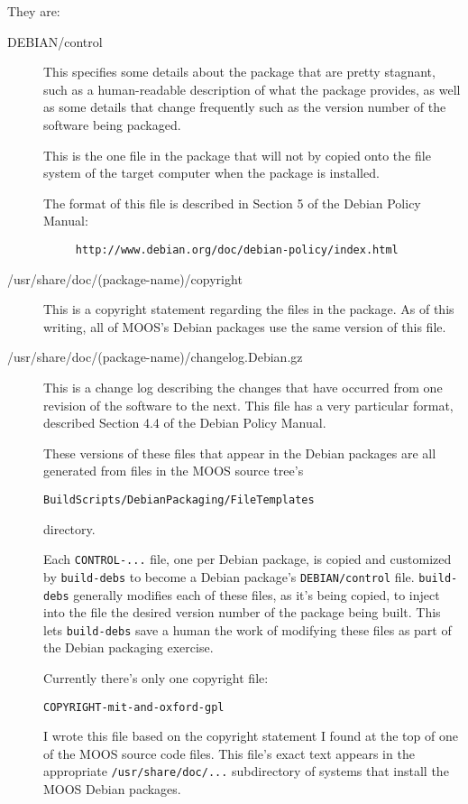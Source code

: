 \documentclass[letterpaper,10pt]{article}
\begin{document}
They are:
\begin{description}
 \item[DEBIAN/control]  This specifies some details about the package that are
	pretty stagnant, such as a human-readable description of what the 
	package provides, as well as some details that change frequently such
	as the version number of the software being packaged.

	This is the one file in the package that will not
	by copied onto the file system of the target computer when the package
	is installed.

	The format of this file is described in Section 5 of the Debian Policy
	Manual:

	\begin{verbatim}
	 http://www.debian.org/doc/debian-policy/index.html
	\end{verbatim} 
 \item[/usr/share/doc/(package-name)/copyright]
	This is a copyright statement regarding the files in the package.
	As of this writing, all of MOOS's Debian packages use the same version
	of this file.

 \item[/usr/share/doc/(package-name)/changelog.Debian.gz]
	This is a change log describing the changes that have occurred 
	from one revision of the software to the next.  This file has a
	very particular format, described Section 4.4 of the Debian
	Policy Manual. 

These versions of these files that appear in the Debian packages are all 
generated from files in the MOOS source tree's
\begin{verbatim}
BuildScripts/DebianPackaging/FileTemplates\end{verbatim} 
directory.

Each \verb|CONTROL-...| file, one per Debian package, is copied and
customized by \verb|build-debs| to become a Debian package's 
\verb|DEBIAN/control| file.  \verb|build-debs| generally modifies
each of these files, as it's being copied, to inject into the file
the desired version number of the package being built.  This lets
\verb|build-debs| save a human the work of modifying these files 
as part of the Debian packaging exercise.

Currently there's only one copyright file:
\begin{verbatim}
COPYRIGHT-mit-and-oxford-gpl
\end{verbatim} 
I wrote this file based on the copyright statement I found at the top of one
of the MOOS source code files.  This file's exact text appears in the appropriate
\verb|/usr/share/doc/...| subdirectory of systems that install the MOOS 
Debian packages.


\end{description}
\end{document}
